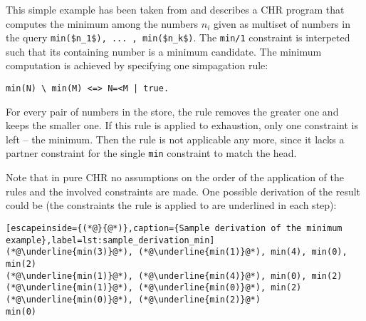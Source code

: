 \begin{example}[Minimum]
\label{ex:minimum}

This simple example has been taken from \cite[19\psqq]{fru_chr_book_2009} and describes a CHR program that computes the minimum among the numbers $n_i$ given as multiset of numbers in the query \lstinline[mathescape]|min($n_1$), ... , min($n_k$)|. The \lstinline|min/1| constraint is interpeted such that its containing number is a minimum candidate. The minimum computation is achieved by specifying one simpagation rule:

\begin{lstlisting}[caption={Minimum program}]
min(N) \ min(M) <=> N=<M | true.
\end{lstlisting}

For every pair of numbers in the store, the rule removes the greater one and keeps the smaller one. If this rule is applied to exhaustion, only one constraint is left -- the minimum. Then the rule is not applicable any more, since it lacks a partner constraint for the single \lstinline|min| constraint to match the head.

Note that in pure CHR no assumptions on the order of the application of the rules and the involved constraints are made. One possible derivation of the result could be (the constraints the rule is applied to are underlined in each step):

\begin{lstlisting}[escapeinside={(*@}{@*)},caption={Sample derivation of the minimum example},label=lst:sample_derivation_min]
(*@\underline{min(3)}@*), (*@\underline{min(1)}@*), min(4), min(0), min(2)
(*@\underline{min(1)}@*), (*@\underline{min(4)}@*), min(0), min(2)
(*@\underline{min(1)}@*), (*@\underline{min(0)}@*), min(2)
(*@\underline{min(0)}@*), (*@\underline{min(2)}@*)
min(0)
\end{lstlisting}
\end{example}

